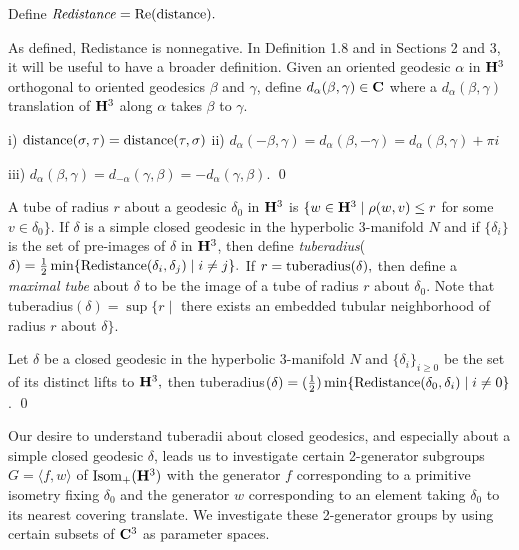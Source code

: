 Define ${\it Redistance} = {\rm Re} ({\rm distance}).$

As defined, Redistance is nonnegative.  In Definition 1.8 and in Sections 2 and 3, it will be useful to have a broader definition. Given an oriented
geodesic $\alpha$ in ${\bf H}^3$ orthogonal to oriented geodesics $\beta$ and $\gamma$, define $d_\alpha(\beta,\gamma) \in {\bf C}$ where a
$d_\alpha(\beta,\gamma)$ translation of ${\bf H}^3$  along $\alpha$ takes $\beta$ to $\gamma.$
\enddemo

{\rm i)}  ${\rm distance}(\sigma,\tau) = {\rm distance}(\tau,\sigma)$ 
{\rm ii)} $d_\alpha(-\beta,\gamma) = d_\alpha(\beta,-\gamma) = d_\alpha(\beta,\gamma) + \pi i$ 
 
{\rm iii)} $d_\alpha(\beta,\gamma) = d_{-\alpha}(\gamma,\beta) = 
-d_\alpha(\gamma,\beta)$. \hfill\qed
\endproclaim

 

A tube of radius $r$ about a geodesic $\delta_0$ in ${\bf H}^3$ is 
$\{w \in {\bf H}^3 \mid \rho(w, v) \le r$ for some $v \in \delta_0 \}.$    
If $\delta$
is a simple closed geodesic in the hyperbolic $3$-manifold $N$ and if
$\{\delta_i \}$ is the set of pre-images of $\delta$ in ${\bf H}^3$, then define
{\it tuberadius}($\delta)={1 \over 2} \min 
\{{\rm Redistance}(\delta_i,\delta_j) \mid i\neq j \}.$
If $r = {\rm tuberadius}(\delta),$ 
then define a {\it maximal tube} about $\delta$ to be the
image of a tube of radius $r$ about $\delta_0.$  Note that
tuberadius$(\delta)=
\sup\{r \mid $ there exists an embedded tubular neighborhood of
radius $r$ about $\delta \}.$
\enddemo

  Let $\delta$ be a closed geodesic in the hyperbolic $3$\/{\rm -}\/manifold $N$ and
$\{\delta_i\}_{i\ge 0}$ be the set of its distinct lifts to ${\bf H}^3,$
then {\rm tuberadius}$(\delta)=({1 \over 2})\min\{{\rm Redistance}(\delta_0,\delta_i)\mid i\neq 0\}$.
\hfill\qed \endproclaim

Our desire to understand tuberadii about closed geodesics, and especially about a simple closed geodesic $\delta$, leads us to investigate certain 2-generator subgroups $G =
\langle f,w\rangle$  of ${\rm Isom}_+({\bf H}^3)$ with the generator $f$ corresponding to a primitive isometry fixing $\delta_0$ and the generator
$w$ corresponding to an element taking $\delta_0$ to its nearest covering translate.  We investigate these 2-generator groups by using certain
subsets of ${\bf C}^3$ as parameter spaces.

